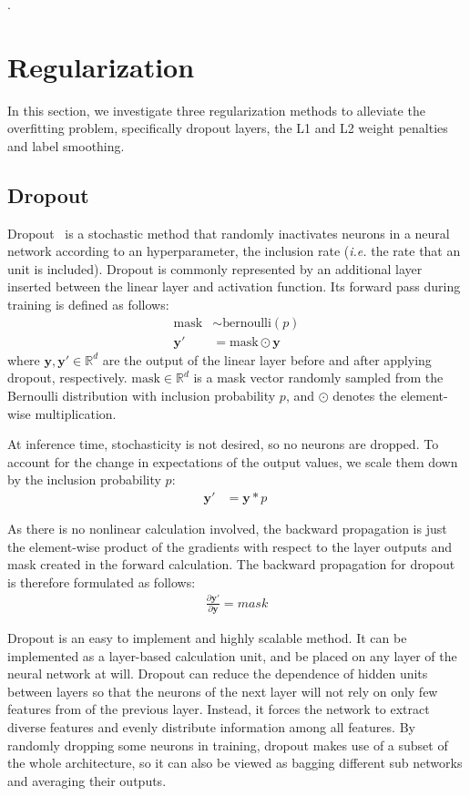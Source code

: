 \documentclass{article}
\begin{document}
\questionFive.




\section{Regularization}
\label{sec:task2.1} 

In this section, we investigate three regularization methods to alleviate the overfitting problem, specifically dropout layers, the L1 and L2 weight penalties and label smoothing.


\subsection{Dropout}

Dropout~\cite{srivastava2014dropout} is a stochastic method that randomly inactivates neurons in a neural network according to an hyperparameter, the inclusion rate  (\textit{i.e.} the rate that an unit is included).
Dropout is commonly represented by an additional layer inserted between the linear layer and activation function.
Its forward pass during training is defined as follows:
\begin{align}
    \text{mask} &\sim \text{bernoulli}(p)\\
    \bm{y}' &= \text{mask} \odot \bm{y}\
\end{align}
where $\bm{y}, \bm{y}' \in \mathbb{R}^d$ are the output of the linear layer before and after applying dropout, respectively. 
$\text{mask} \in \mathbb{R}^d$ is a mask vector randomly sampled from the Bernoulli distribution with inclusion probability $p$, and $\odot$ denotes the element-wise multiplication.

At inference time, stochasticity is not desired, so no neurons are dropped. 
To account for the change in expectations of the output values, we scale them down by the inclusion probability $p$:
\begin{align}
    \bm{y}' &= \bm{y}*p\
\end{align}

As there is no nonlinear calculation involved, the backward propagation is just the element-wise product of the gradients with respect to the layer outputs and mask created in the forward calculation. 
The backward propagation for dropout is therefore formulated as follows:
\begin{align}
    \frac{\partial \bm{y}'}{\partial \bm{y}} = mask
\end{align}

Dropout is an easy to implement and highly scalable method. 
It can be implemented as a layer-based calculation unit, and be placed on any layer of the neural network at will. 
Dropout can reduce the dependence of hidden units between layers so that the neurons of the next layer will not rely on only few features from of the previous layer.
Instead, it forces the network to extract diverse features and evenly distribute information among all features. 
By randomly dropping some neurons in training, dropout makes use of a subset of the whole architecture, so it can also be viewed as bagging different sub networks and averaging their outputs.
\end{document}
